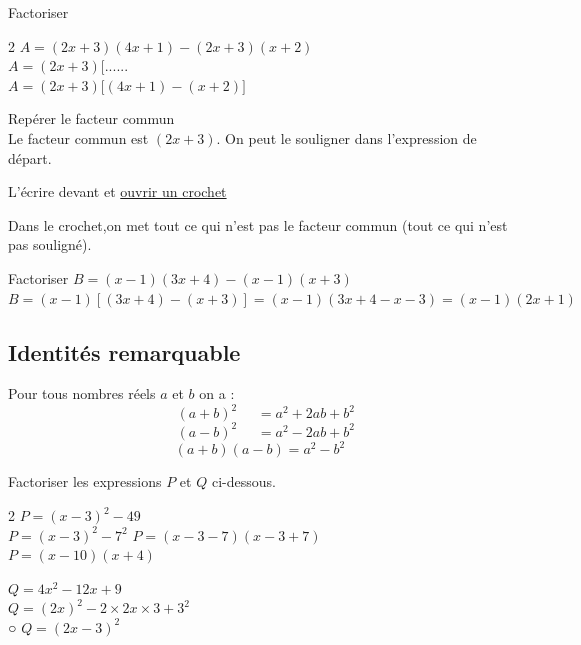 \documentclass[11pt,a4paper]{book}
\begin{document}
\begin{bmethodet}{Factoriser}
	\begin{multicols}{2}
		$A=(2x+3)(4x+1)-(2x+3)(x+2)$\vspace{1cm}\\
		$A=(2x+3)\lbrack......$\vspace{1cm}\\
		$A=(2x+3)\lbrack(4x+1)-(x+2)\rbrack$\\
		\vfill\columnbreak
		\begin{enumMet}
			\item Repérer le facteur commun\\
			Le facteur commun est $(2x+3)$. On peut le souligner dans l'expression de départ.
			\item L'écrire devant et \underline{ouvrir un crochet }
			\item Dans le crochet,on met tout ce qui n'est pas le facteur commun (tout ce qui n'est pas souligné).
		\end{enumMet}
	\end{multicols}
\end{bmethodet}

\begin{bexemple}{}
	Factoriser $B=(x-1)(3x+4)-(x-1)(x+3)$\\
	$B=(x-1)\left[(3x+4)-(x+3)\right]=(x-1)(3x+4-x-3)=(x-1)(2x+1)$
\end{bexemple}

\subsection{Identités remarquable}

\begin{bprop}
	
	
	\noindent Pour tous nombres réels $a$ et $b$  on a :
	$$\phantom{X} \left(a + b \right)^2 \phantom{Xx} =  a^2 + 2ab +b^2$$
	$$\phantom{X} \left(a - b \right)^2 \phantom{Xx} =  a^2 - 2ab +b^2$$
	$$\left(a + b \right)\left( a- b\right) = a^2 - b^2$$
\end{bprop}

\begin{bexemple}{}
	Factoriser les expressions $P$ et $Q$ ci-dessous.
	\vspace{-0.3cm}
	\setlength{\columnseprule}{0.4pt} 
	\begin{multicols}{2}  
		$P=(x-3)^2-49$ \\
		$P=(x-3)^2-7^2$
		$P=(x-3-7)(x-3+7)$\\
		$P=(x-10)(x+4)$
		
		\columnbreak
		$Q=4x^2-12x+9$ \\
		$Q=(2x)^2-2\times 2x\times 3+3^2$\\○
		$Q=(2x-3)^2$
	\end{multicols} 
\end{bexemple}
\end{document}
